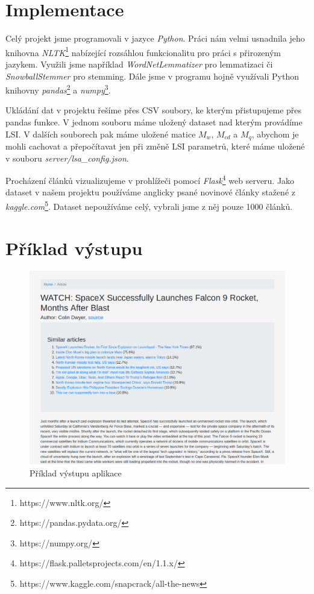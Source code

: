 \documentclass[11pt]{scrartcl} %
\begin{document}
\section{Implementace}

Celý projekt jsme programovali v jazyce \emph{Python}. Práci nám velmi usnadnila jeho knihovna \emph{NLTK}\footnote{https://www.nltk.org/} nabízející rozsáhlou funkcionalitu pro práci s přirozeným jazykem. Využili jsme například \emph{WordNetLemmatizer} pro lemmatizaci či \emph{SnowballStemmer} pro stemming. Dále jsme v programu hojně využívali Python knihovny \emph{pandas}\footnote{https://pandas.pydata.org/} a \emph{numpy}\footnote{https://numpy.org/}.

\bigskip

Ukládání dat v projektu řešíme přes CSV soubory, ke kterým přistupujeme přes pandas funkce. V jednom souboru máme uložený dataset nad kterým provádíme LSI. V dalších souborech pak máme uložené matice $M_w$, $M_{cd}$ a $M_q$, abychom je mohli cachovat a přepočítavat jen při změně LSI parametrů, které máme uložené v souboru \emph{server/lsa\_config.json}.

\bigskip

Procházení článků vizualizujeme v prohlížeči pomocí \emph{Flask}\footnote{https://flask.palletsprojects.com/en/1.1.x/} web serveru. Jako dataset v našem projektu používáme anglicky psané novinové články stažené z \emph{kaggle.com}\footnote{https://www.kaggle.com/snapcrack/all-the-news}. Dataset nepoužíváme celý, vybrali jsme z něj pouze 1000 článků.

\section{Příklad výstupu}

\begin{figure}[h] %
	\centering
	\includegraphics[width=0.7\columnwidth]{output.png}
	\caption{Příklad výstupu aplikace}
	\label{output}
\end{figure}
\end{document}
